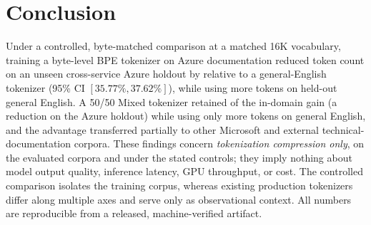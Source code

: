 \section{Conclusion}
\label{sec:conclusion}

Under a controlled, byte-matched comparison at a matched 16K vocabulary, training a
byte-level BPE tokenizer on Azure documentation reduced token count on an unseen
cross-service Azure holdout by  relative to a general-English
tokenizer (95\% CI $[35.77\%, 37.62\%]$), while using  more tokens on
held-out general English. A 50/50 Mixed tokenizer retained  of the
in-domain gain (a  reduction on the Azure holdout) while using only
 more tokens on general English, and the advantage transferred
partially to other Microsoft and external technical-documentation corpora. These findings concern \emph{tokenization
compression only}, on the evaluated corpora and under the stated controls; they
imply nothing about model output quality, inference latency, GPU throughput, or
cost. The controlled comparison isolates the training corpus, whereas existing
production tokenizers differ along multiple axes and serve only as observational
context. All numbers are reproducible from a released, machine-verified artifact.
